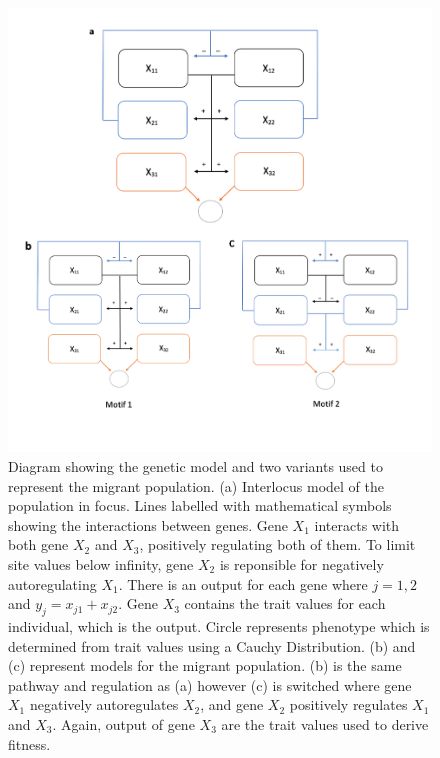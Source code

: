 \begin{figure}
    \begin{center}
        \includegraphics[scale=0.35]{../Results/Model_diagram.jpg}
    \end{center}
    \caption{Diagram showing the genetic model and two variants used to represent the migrant population. (a) Interlocus model of the population in focus. Lines labelled with mathematical symbols showing the interactions between genes. Gene $X_1$ interacts with both gene $X_2$ and $X_3$, positively regulating both of them. To limit site values below infinity, gene $X_2$ is reponsible for negatively autoregulating $X_1$. There is an output for each gene where $j = {1,2}$ and $y_j = x_{j1} + x_{j2}$. Gene $X_3$ contains the trait values for each individual, which is the output. Circle represents phenotype which is determined from trait values using a Cauchy Distribution. (b) and (c) represent models for the migrant population. (b) is the same pathway and regulation as (a) however (c) is switched where gene $X_1$ negatively autoregulates $X_2$, and gene $X_2$ positively regulates $X_1$ and $X_3$. Again, output of gene $X_3$ are the trait values used to derive fitness.}
    \label{fig:Starting parameters}
\end{figure}
